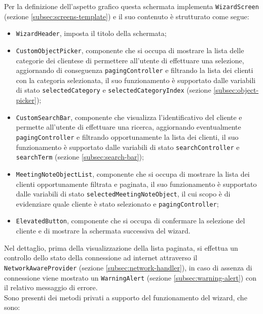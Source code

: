 Per la definizione dell'aspetto grafico questa schermata implementa \lstinline{WizardScreen} (sezione \ref{subsec:screens-template}) e il suo contenuto è strutturato come segue:
\begin{itemize}
    \item \lstinline{WizardHeader}, imposta il titolo della schermata;
    \item \lstinline{CustomObjectPicker}, componente che si occupa di mostrare la lista delle categorie dei \glspl{cliente}\glsoccur e di permettere all'utente di effettuare una selezione, aggiornando di conseguenza \lstinline{pagingController} e filtrando la lista dei clienti con la categoria selezionata, il suo funzionamento è supportato dalle variabili di stato \lstinline{selectedCategory} e \lstinline{selectedCategoryIndex} (sezione \ref{subsec:object-picker});
    \item \lstinline{CustomSearchBar}, componente che visualizza l'identificativo del cliente e permette all'utente di effettuare una ricerca, aggiornando eventualmente \lstinline{pagingController} e filtrando opportunamente la lista dei clienti, il suo funzionamento è supportato dalle variabili di stato \lstinline{searchController} e \lstinline{searchTerm} (sezione \ref{subsec:search-bar});
    \item \lstinline{MeetingNoteObjectList}, componente che si occupa di mostrare la lista dei clienti opportunamente filtrata e paginata, il suo funzionamento è supportato dalle variabili di stato \lstinline{selectedMeetingNoteObject}, il cui scopo è di evidenziare quale cliente è stato selezionato e \lstinline{pagingController};
    \item \lstinline{ElevatedButton}\cite{site:elevated-button}, componente che si occupa di confermare la selezione del cliente e di mostrare la schermata successiva del \gls{wizard}\glsoccur.
\end{itemize}
Nel dettaglio, prima della visualizzazione della lista paginata, si effettua un controllo dello stato della connessione ad internet attraverso il \lstinline{NetworkAwareProvider} (sezione \ref{subsec:network-handler}), in caso di assenza di connessione viene mostrato un \lstinline{WarningAlert} (sezione \ref{subsec:warning-alert}) con il relativo messaggio di errore. \\
Sono presenti dei metodi privati a supporto del funzionamento del \gls{wizard}\glsoccur, che sono:
